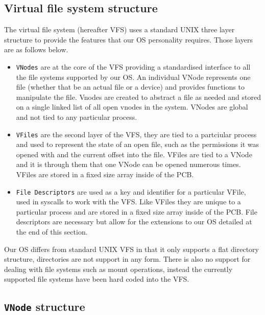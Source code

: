 \documentclass[12pt,english]{article}
\begin{document}
\subsection{Virtual file system structure}

The virtual file system (hereafter VFS) uses a standard UNIX three layer structure to provide the features that our OS personality requires. Those layers are as follows below.

\begin{itemize}
\item \texttt{VNodes} are at the core of the VFS providing a standardised interface to all the file systems supported by our OS. An individual VNode represents one file (whether that be an actual file or a device) and provides functions to manipulate the file. Vnodes are created to abstract a file as needed and stored on a single linked list of all open vnodes in the system. VNodes are global and not tied to any particular process.
\item \texttt{VFiles} are the second layer of the VFS, they are tied to a partciular process and used to represent the state of an open file, such as the permissions it was opened with and the current offset into the file. VFiles are tied to a VNode and it is through them that one VNode can be opened numerous times. VFiles are stored in a fixed size array inside of the PCB.
\item \texttt{File Descriptors} are used as a key and identifier for a particular VFile, used in syscalls to work with the VFS. Like VFiles they are unique to a particular process and are stored in a fixed size array inside of the PCB. File descriptors are necessary but allow for the extensions to our OS detailed at the end of this section.
\end{itemize}

Our OS differs from standard UNIX VFS in that it only supports a flat directory structure, directories are not support in any form. There is also no support for dealing with file systems such as mount operations, instead the currently supported file systems have been hard coded into the VFS.

\subsection{\texttt{VNode} structure}
\end{document}
